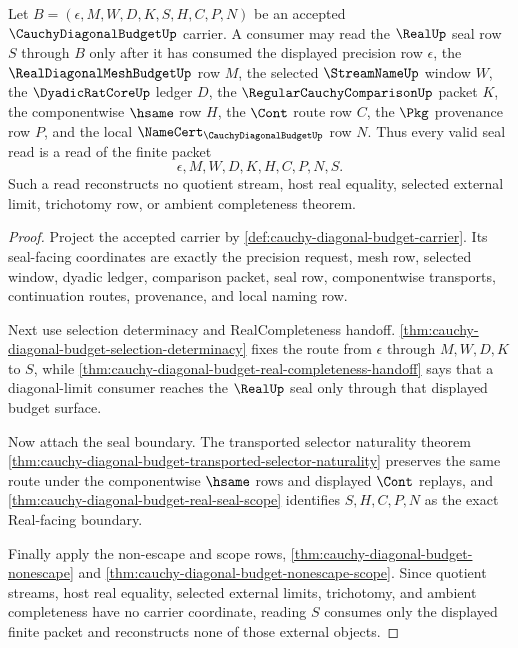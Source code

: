 \begin{theorem}
\label{thm:cauchy-diagonal-budget-seal-consumption}
Let $B=(\epsilon,M,W,D,K,S,H,C,P,N)$ be an accepted $\CauchyDiagonalBudgetUp$ carrier. A consumer may read the $\RealUp$ seal row $S$ through $B$ only after it has consumed the displayed precision row $\epsilon$, the $\RealDiagonalMeshBudgetUp$ row $M$, the selected $\StreamNameUp$ window $W$, the $\DyadicRatCoreUp$ ledger $D$, the $\RegularCauchyComparisonUp$ packet $K$, the componentwise $\hsame$ row $H$, the $\Cont$ route row $C$, the $\Pkg$ provenance row $P$, and the local $\NameCert_{\CauchyDiagonalBudgetUp}$ row $N$. Thus every valid seal read is a read of the finite packet
$$
\epsilon,M,W,D,K,H,C,P,N,S.
$$
Such a read reconstructs no quotient stream, host real equality, selected external limit, trichotomy row, or ambient completeness theorem.
\end{theorem}
\begin{proof}
Project the accepted carrier by \autoref{def:cauchy-diagonal-budget-carrier}. Its seal-facing coordinates are exactly the precision request, mesh row, selected window, dyadic ledger, comparison packet, seal row, componentwise transports, continuation routes, provenance, and local naming row.

Next use selection determinacy and RealCompleteness handoff. \autoref{thm:cauchy-diagonal-budget-selection-determinacy} fixes the route from $\epsilon$ through $M,W,D,K$ to $S$, while \autoref{thm:cauchy-diagonal-budget-real-completeness-handoff} says that a diagonal-limit consumer reaches the $\RealUp$ seal only through that displayed budget surface.

Now attach the seal boundary. The transported selector naturality theorem \autoref{thm:cauchy-diagonal-budget-transported-selector-naturality} preserves the same route under the componentwise $\hsame$ rows and displayed $\Cont$ replays, and \autoref{thm:cauchy-diagonal-budget-real-seal-scope} identifies $S,H,C,P,N$ as the exact Real-facing boundary.

Finally apply the non-escape and scope rows, \autoref{thm:cauchy-diagonal-budget-nonescape} and \autoref{thm:cauchy-diagonal-budget-nonescape-scope}. Since quotient streams, host real equality, selected external limits, trichotomy, and ambient completeness have no carrier coordinate, reading $S$ consumes only the displayed finite packet and reconstructs none of those external objects.
\end{proof}

